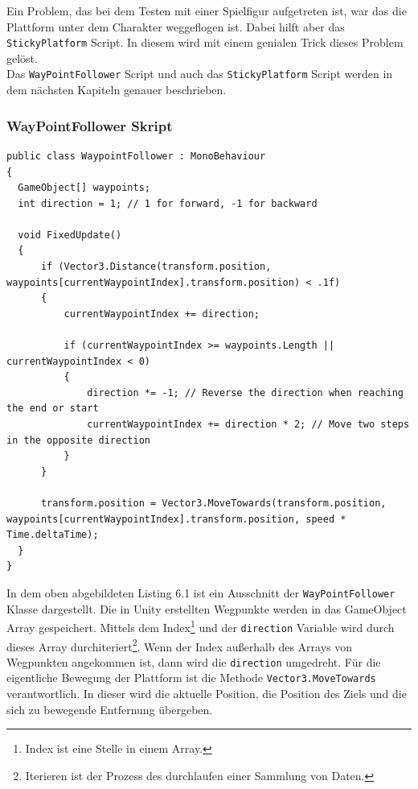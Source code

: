 Ein Problem, das bei dem Testen mit einer Spielfigur aufgetreten ist, war das die Plattform unter dem Charakter weggeflogen ist. Dabei hilft aber das \verb+StickyPlatform+ Script. In diesem wird mit einem genialen Trick dieses Problem gelöst.\\

Das \verb+WayPointFollower+ Script und auch das \verb+StickyPlatform+ Script werden in dem nächsten Kapiteln genauer beschrieben. 

\pagebreak

\subsubsection{WayPointFollower Skript}

\begin{lstlisting}[language=CSharp,caption={FixedUpdate der WayPointFollower Klasse.},label=code:mainmenu]
public class WaypointFollower : MonoBehaviour
{
  GameObject[] waypoints;
  int direction = 1; // 1 for forward, -1 for backward

  void FixedUpdate()
  {
      if (Vector3.Distance(transform.position, waypoints[currentWaypointIndex].transform.position) < .1f)
      {
          currentWaypointIndex += direction;

          if (currentWaypointIndex >= waypoints.Length || currentWaypointIndex < 0)
          {
              direction *= -1; // Reverse the direction when reaching the end or start
              currentWaypointIndex += direction * 2; // Move two steps in the opposite direction
          }
      }

      transform.position = Vector3.MoveTowards(transform.position, waypoints[currentWaypointIndex].transform.position, speed * Time.deltaTime);
  }
}
\end{lstlisting}

In dem oben abgebildeten Listing 6.1 ist ein Ausschnitt der \verb+WayPointFollower+ Klasse dargestellt. Die in Unity erstellten Wegpunkte werden in das GameObject Array gespeichert. Mittels dem Index\footnote[1]{Index ist eine Stelle in einem Array.} und der \verb+direction+ Variable wird durch dieses Array durchiteriert\footnote[2]{Iterieren ist der Prozess des durchlaufen einer Sammlung von Daten.}. Wenn der Index außerhalb des Arrays von Wegpunkten angekommen ist, dann wird die \verb+direction+ umgedreht. Für die eigentliche Bewegung der Plattform ist die Methode \verb+Vector3.MoveTowards+ verantwortlich. In dieser wird die aktuelle Position, die Position des Ziels und die sich zu bewegende Entfernung übergeben.


